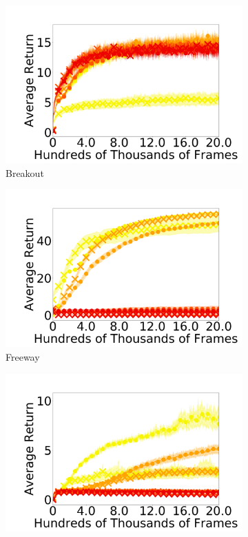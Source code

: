 \documentclass{article}
\begin{document}
\begin{figure}[t]
  \begin{subfigure}[b]{0.25\linewidth}
    \centering
    \includegraphics[width=\columnwidth]{figs/deep/discrete/UNLABELED_breakout_all_kl.png} 
    \caption{Breakout
    }\label{fig:breakout}
  \end{subfigure}%
  \begin{subfigure}[b]{0.25\linewidth}
    \centering
    \includegraphics[width=\columnwidth]{figs/deep/discrete/UNLABELED_freeway_all_kl.png} 
    \caption{Freeway
    }\label{fig:freeway}
  \end{subfigure}%
  \begin{subfigure}[b]{0.25\linewidth}
    \centering
    \includegraphics[width=\columnwidth]{figs/deep/discrete/UNLABELED_seaquest_all_kl.png} 

\end{subfigure}
\end{figure}
\end{document}
